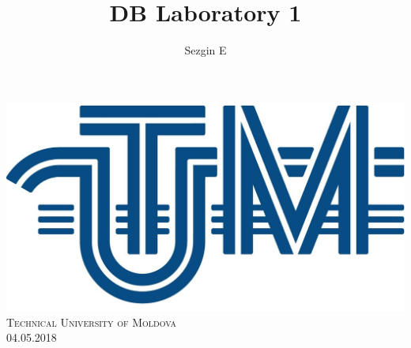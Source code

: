 \documentclass[12pt]{article}
\title{DB Laboratory 1}
\author{Sezgin E}
\begin{document}
        
        
        \begin{titlepage}
                \centering
                \vspace*{0.5 cm}
                \includegraphics[scale = 0.11]{LOGO_UTM.jpg}\\[1.0 cm]	%
                \textsc{\LARGE Technical University of Moldova}\\[2.0 cm]%
                \textsc{\Large 04.05.2018}\\[0.5 cm]		%


\end{titlepage}
\end{document}
